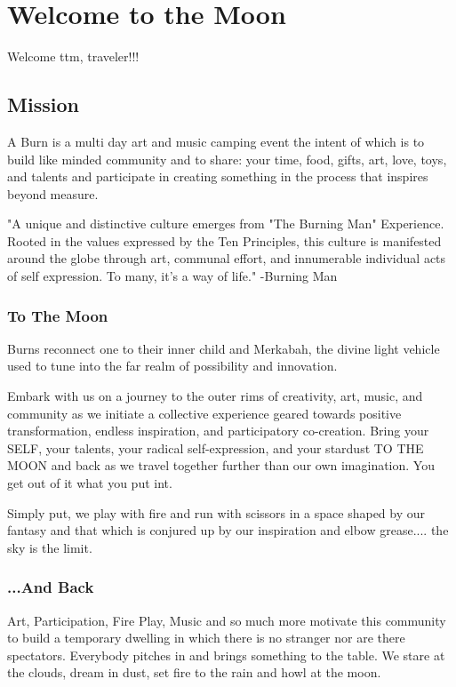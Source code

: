 %
%

\chapter{Welcome to the Moon}

Welcome \gls{ttm}, traveler!!!



\section*{Mission}
A Burn is a  multi day art and music camping event the intent of which is to build like minded community and to share:
your time, food, gifts, art, love, toys, and talents and participate in creating something in the process that inspires beyond measure.

"A unique and distinctive culture emerges from "The Burning Man" Experience. Rooted in the values expressed by the Ten Principles, this culture is manifested around the globe through art, communal effort, and innumerable individual acts of self expression. To many, it's a way of life." -Burning Man

\subsection*{To The Moon}
Burns reconnect one to their inner child and Merkabah, the divine light vehicle used to tune into the far realm of possibility and innovation.

Embark with us on a journey to the outer rims of creativity, art, music, and community as we initiate a collective experience geared towards positive transformation, endless inspiration, and participatory
co-creation. Bring your SELF, your talents, your radical self-expression, and your stardust TO THE MOON and back as we travel together further than our own imagination. You get out of it what you put int.

Simply put, we play with fire and run with scissors in a space shaped by our fantasy and that which is conjured up by our inspiration and elbow grease.... the sky is the limit. 

\subsection*{...And Back}
Art, Participation, Fire Play, Music and so much more motivate this 
community to build a temporary dwelling in which there is no stranger nor are there spectators. Everybody pitches in and brings something to the table.  
We stare at the clouds, dream in dust, set fire to the rain and howl at the moon.  

